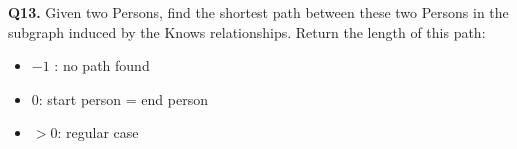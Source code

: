 \textbf{Q13.}
Given two Persons, find the shortest path between these two Persons in
the subgraph induced by the Knows relationships.
Return the length of this path:
\begin{itemize}
\tightlist
\item
  \(-1\) : no path found
\item
  \(0\): start person = end person
\item
  \(> 0\): regular case
\end{itemize}
